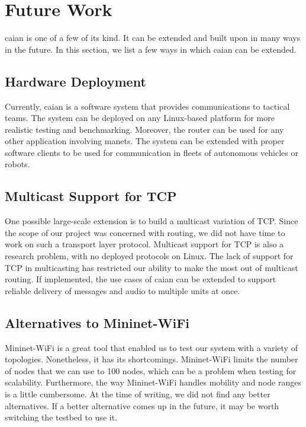 \section{Future Work}

\acrshort{caian} is one of a few of its kind. It can be extended and built upon in many ways in the future. In this section, we list a few ways in which \acrshort{caian} can be extended.

\subsection{Hardware Deployment}
Currently, \acrshort{caian} is a software system that provides communications to tactical teams. The system can be deployed on any Linux-based platform for more realistic testing and benchmarking. Moreover, the router can be used for any other application involving \acrshort{manets}. The system can be extended with proper software clients to be used for communication in fleets of autonomous vehicles or robots.

\subsection{Multicast Support for TCP}
One possible large-scale extension is to build a multicast variation of TCP. Since the scope of our project was concerned with routing, we did not have time to work on such a transport layer protocol. Multicast support for TCP is also a research problem, with no deployed protocols on Linux. The lack of support for TCP in multicasting has restricted our ability to make the most out of multicast routing. If implemented, the use cases of \acrshort{caian} can be extended to support reliable delivery of messages and audio to multiple units at once.

\subsection{Alternatives to Mininet-WiFi}
Mininet-WiFi is a great tool that enabled us to test our system with a variety of topologies. 
Nonetheless, it has its shortcomings. 
Mininet-WiFi limits the number of nodes that we can use to 100 nodes, which can be a problem when testing for scalability. 
Furthermore, the way Mininet-WiFi handles mobility and node ranges is a little cumbersome. 
At the time of writing, we did not find any better alternatives. 
If a better alternative comes up in the future, it may be worth switching the testbed to use it.

